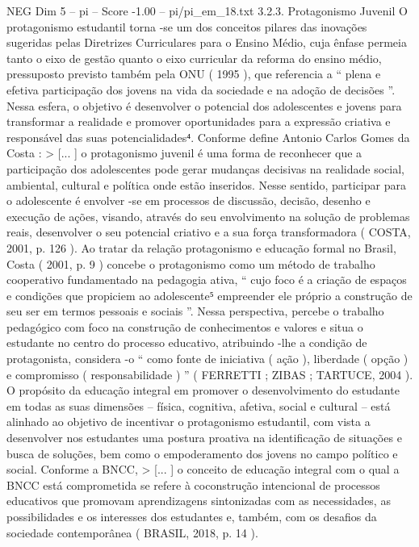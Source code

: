 \begin{textsample}{NEG Dim 5 – pi – Score -1.00 – pi/pi\_em\_18.txt}  \label{ex:f5_neg_053}
3.2.3.
Protagonismo Juvenil O protagonismo estudantil torna -se um dos conceitos pilares das inovações sugeridas pelas Diretrizes Curriculares para o Ensino Médio, cuja ênfase permeia tanto o eixo de gestão quanto o eixo curricular da reforma do ensino médio, pressuposto previsto também pela ONU ( 1995 ), que referencia a “ plena e efetiva participação dos jovens na vida da sociedade e na adoção de decisões ”.
Nessa esfera, o objetivo é desenvolver o potencial dos adolescentes e jovens para transformar a realidade e promover oportunidades para a expressão criativa e responsável das suas potencialidades⁴.
Conforme define Antonio Carlos Gomes da Costa : > [... ] o protagonismo juvenil é uma forma de reconhecer que a participação dos adolescentes pode gerar mudanças decisivas na realidade social, ambiental, cultural e política onde estão inseridos.
Nesse sentido, participar para o adolescente é envolver -se em processos de discussão, decisão, desenho e execução de ações, visando, através do seu envolvimento na solução de problemas reais, desenvolver o seu potencial criativo e a sua força transformadora ( COSTA, 2001, p. 126 ).
Ao tratar da relação protagonismo e educação formal no Brasil, Costa ( 2001, p. 9 ) concebe o protagonismo como um método de trabalho cooperativo fundamentado na pedagogia ativa, “ cujo foco é a criação de espaços e condições que propiciem ao adolescente⁵ empreender ele próprio a construção de seu ser em termos pessoais e sociais ”.
Nessa perspectiva, percebe o trabalho pedagógico com foco na construção de conhecimentos e valores e situa o estudante no centro do processo educativo, atribuindo -lhe a condição de protagonista, considera -o “ como fonte de iniciativa ( ação ), liberdade ( opção ) e compromisso ( responsabilidade ) ” ( FERRETTI ; ZIBAS ; TARTUCE, 2004 ).
O propósito da educação integral em promover o desenvolvimento do estudante em todas as suas dimensões – física, cognitiva, afetiva, social e cultural – está alinhado ao objetivo de incentivar o protagonismo estudantil, com vista a desenvolver nos estudantes uma postura proativa na identificação de situações e busca de soluções, bem como o empoderamento dos jovens no campo político e social.
Conforme a BNCC, > [... ] o conceito de educação integral com o qual a BNCC está comprometida se refere à coconstrução intencional de processos educativos que promovam aprendizagens sintonizadas com as necessidades, as possibilidades e os interesses dos estudantes e, também, com os desafios da sociedade contemporânea ( BRASIL, 2018, p. 14 ).

\end{textsample}
